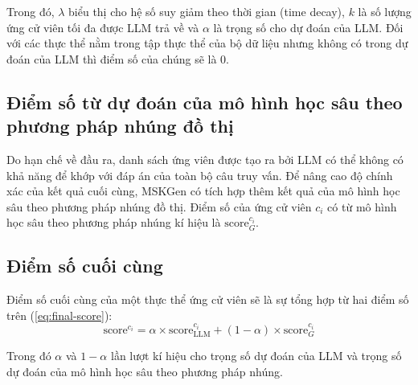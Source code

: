 Trong đó, $\lambda$ biểu thị cho hệ số suy giảm theo thời gian (time decay), $k$ là số lượng ứng cử viên tối đa được LLM trả về và $\alpha$ là trọng số cho dự đoán của LLM. Đối với các thực thể nằm trong tập thực thể của bộ dữ liệu nhưng không có trong dự đoán của LLM thì điểm số của chúng sẽ là 0.

\vspace{1em}
\subsection{Điểm số từ dự đoán của mô hình học sâu theo phương pháp nhúng đồ thị}

Do hạn chế về đầu ra, danh sách ứng viên được tạo ra bởi LLM có thể không có khả năng để khớp với đáp án của toàn bộ câu truy vấn. Để nâng cao độ chính xác của kết quả cuối cùng, MSKGen có tích hợp thêm kết quả của mô hình học sâu theo phương pháp nhúng đồ thị. Điểm số của ứng cử viên $c_i$ có từ mô hình học sâu theo phương pháp nhúng kí hiệu là $\text{score}_G^{c_i}$.

\vspace{1em}
\subsection{Điểm số cuối cùng}

Điểm số cuối cùng của một thực thể ứng cử viên sẽ là sự tổng hợp từ hai điểm số trên (\ref{eq:final-score}):
\begin{equation}
    \label{eq:final-score}
    \text{score}^{c_i} = \alpha \times \text{score}^{c_i}_{\text{LLM}} + (1 - \alpha) \times \text{score}_G^{c_i}
\end{equation}

Trong đó $\alpha$ và $1 - \alpha$ lần lượt kí hiệu cho trọng số dự đoán của LLM và trọng số dự đoán của mô hình học sâu theo phương pháp nhúng.

